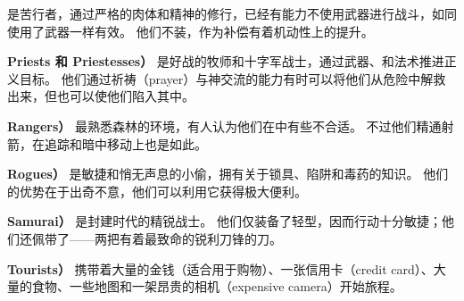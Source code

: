 \documentclass[a4paper, 10pt]{article}
\newcommand{\bb}[1]{\bf #1 \hfill}
\begin{document}
是苦行者，通过严格的肉体和精神的修行，已经有能力不使用武器进行战斗，如同使用了武器一样有效。
他们不装\zhTransArmor{}，作为补偿有着机动性上的提升。
%
\item[\bb{\zhTransPriests{\rm （}Priests {\rm 和} Priestesses{\rm ）}}]%
是好战的牧师和十字军战士，通过武器、\zhTransArmor{}和法术推进正义目标。
他们通过祈祷（prayer）与神交流的能力有时可以将他们从危险中解救出来，但也可以使他们陷入其中。
%
\item[\bb{\zhTransRangers{\rm （}Rangers{\rm ）}}]%
最熟悉森林的环境，有人认为他们在\zhTransDungeon{}中有些不合适。
不过他们精通射箭，在追踪和暗中移动上也是如此。
%
\item[\bb{\zhTransRogues{\rm （}Rogues{\rm ）}}]%
是敏捷和悄无声息的小偷，拥有关于锁具、陷阱和毒药的知识。
他们的优势在于出奇不意，他们可以利用它获得极大便利。
%
\item[\bb{\zhTransSamurai{\rm （}Samurai{\rm ）}}]%
是封建时代\zhTransNippon{}的精锐战士。
他们仅装备了轻型\zhTransArmor{}，因而行动十分敏捷；他们还佩带了{\it \zhTransDaisho}——两把有着最致命的锐利刀锋的刀。
%
\item[\bb{\zhTransTourists{\rm （}Tourists{\rm ）}}]%
携带着大量的金钱（适合用于购物）、一张信用卡（credit card）、大量的食物、一些地图和一架昂贵的相机（expensive camera）开始旅程。
\end{document}
